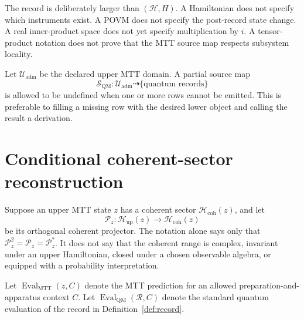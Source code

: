 \documentclass[11pt]{article}
\theoremstyle{definition}
\theoremstyle{remark}
\newcommand{\cH}{\mathcal H}
\newcommand{\cP}{\mathcal P}
\newcommand{\cR}{\mathcal R}
\newcommand{\cS}{\mathcal S}
\newcommand{\cU}{\mathcal U}
\begin{document}
The record is deliberately larger than \((\cH,H)\).  A Hamiltonian does not
specify which instruments exist.  A POVM does not specify the post-record
state change.  A real inner-product space does not yet specify multiplication
by \(i\).  A tensor-product notation does not prove that the MTT source map
respects subsystem locality.

Let \(\cU_{\mathrm{adm}}\) be the declared upper MTT domain.  A partial source
map
\[
\cS_{\mathrm{QM}}\colon
\cU_{\mathrm{adm}}\dashrightarrow
\{\text{quantum records}\}
\]
is allowed to be undefined when one or more rows cannot be emitted.  This is
preferable to filling a missing row with the desired lower object and calling
the result a derivation.

\section{Conditional coherent-sector reconstruction}
\label{sec:reconstruction}

Suppose an upper MTT state \(z\) has a coherent sector
\(\cH_{\mathrm{coh}}(z)\), and let
\[
\cP_z\colon\cH_{\mathrm{up}}(z)\longrightarrow
\cH_{\mathrm{coh}}(z)
\]
be its orthogonal coherent projector.  The notation alone says only that
\(\cP_z^2=\cP_z=\cP_z^*\).  It does not say that the coherent range is
complex, invariant under an upper Hamiltonian, closed under a chosen
observable algebra, or equipped with a probability interpretation.

Let \(\operatorname{Eval}_{\mathrm{MTT}}(z,C)\) denote the MTT prediction for
an allowed preparation-and-apparatus context \(C\).  Let
\(\operatorname{Eval}_{\mathrm{QM}}(\cR,C)\) denote the standard quantum
evaluation of the record in Definition~\ref{def:record}.
\end{document}

